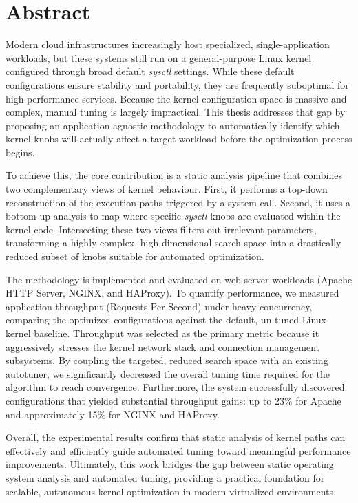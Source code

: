 \chapter*{Abstract} \label{abtract}


Modern cloud infrastructures increasingly host specialized, single-application workloads, but these systems still run on a general-purpose Linux kernel configured through broad default \textit{sysctl} settings.
While these default configurations ensure stability and portability, they are frequently suboptimal for high-performance services.
Because the kernel configuration space is massive and complex, manual tuning is largely impractical.
This thesis addresses that gap by proposing an application-agnostic methodology to automatically identify which kernel knobs will actually affect a target workload before the optimization process begins.

To achieve this, the core contribution is a static analysis pipeline that combines two complementary views of kernel behaviour.
First, it performs a top-down reconstruction of the execution paths triggered by a system call.
Second, it uses a bottom-up analysis to map where specific \textit{sysctl} knobs are evaluated within the kernel code.
Intersecting these two views filters out irrelevant parameters, transforming a highly complex, high-dimensional search space into a drastically reduced subset of knobs suitable for automated optimization.

The methodology is implemented and evaluated on web-server workloads (Apache HTTP Server, NGINX, and HAProxy).
To quantify performance, we measured application throughput (Requests Per Second) under heavy concurrency, comparing the optimized configurations against the default, un-tuned Linux kernel baseline.
Throughput was selected as the primary metric because it aggressively stresses the kernel network stack and connection management subsystems.
By coupling the targeted, reduced search space with an existing autotuner, we significantly decreased the overall tuning time required for the algorithm to reach convergence.
Furthermore, the system successfully discovered configurations that yielded substantial throughput gains: up to 23\% for Apache and approximately 15\% for NGINX and HAProxy.

Overall, the experimental results confirm that static analysis of kernel paths can effectively and efficiently guide automated tuning toward meaningful performance improvements.
Ultimately, this work bridges the gap between static operating system analysis and automated tuning, providing a practical foundation for scalable, autonomous kernel optimization in modern virtualized environments.

\newpage

